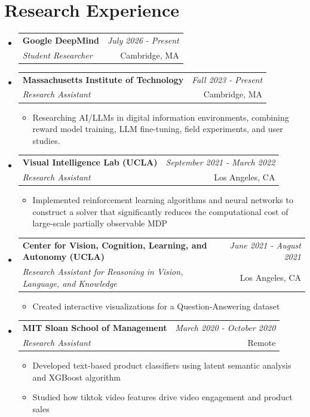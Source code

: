 \documentclass[a4paper,11pt]{article}
\makeatletter
\newcommand{\resumeSubheading}[4]{
\vspace{0.5mm}\item
    \begin{tabular*}{0.98\textwidth}[t]{l@{\extracolsep{\fill}}r}
        \textbf{#1} & \textit{\footnotesize{#4}} \\
        \textit{\footnotesize{#3}} &  \footnotesize{#2}\\
    \end{tabular*}
    \vspace{-2.4mm}
}
\newcommand{\resumeSubHeadingListStart}{\begin{itemize}[leftmargin=*,labelsep=1mm]}
\newcommand{\resumeItemListStart}{\begin{itemize}[leftmargin=*,labelsep=1mm,itemsep=0.5mm]}
\newcommand{\resumeSubHeadingListEnd}{\end{itemize}\vspace{2mm}}
\newcommand{\resumeItemListEnd}{\end{itemize}\vspace{-5mm}}
\makeatother
\begin{document}
\section{\textbf{Research Experience}}
\vspace{-0.4mm}
  \resumeSubHeadingListStart
  \resumeSubheading
      {{Google DeepMind}}{Cambridge, MA}
      {Student Researcher}{July 2026 - Present}
  \resumeSubheading
      {{Massachusetts Institute of Technology}}{Cambridge, MA}
      {Research Assistant}{Fall 2023 - Present}
      \resumeItemListStart
        \item Researching AI/LLMs in digital information environments, combining reward model training, LLM fine-tuning, field experiments, and user studies.     
      \resumeItemListEnd
  \resumeSubheading
      {{Visual Intelligence Lab (UCLA)}}{Los Angeles, CA}
      {Research Assistant}{September 2021 - March 2022}
      \resumeItemListStart
        \item Implemented reinforcement learning algorithms and neural networks to construct a solver that significantly reduces the computational cost of large-scale partially observable MDP
      \resumeItemListEnd 
  \resumeSubheading
    {Center for Vision, Cognition, Learning, and Autonomy (UCLA)}{Los Angeles, CA}
    {Research Assistant for Reasoning in Vision, Language, and Knowledge}{June 2021 - August 2021}
    \resumeItemListStart
      \item Created interactive visualizations for a Question-Answering dataset
    \resumeItemListEnd
    \resumeSubheading
    {MIT Sloan School of Management}{Remote}
    {Research Assistant}{March 2020 - October 2020}
    \resumeItemListStart
     \item Developed text-based product classifiers using latent semantic analysis and XGBoost algorithm
     \item Studied how tiktok video features drive video engagement and product sales
    \resumeItemListEnd
  \resumeSubHeadingListEnd
\vspace{-1mm}
\end{document}
